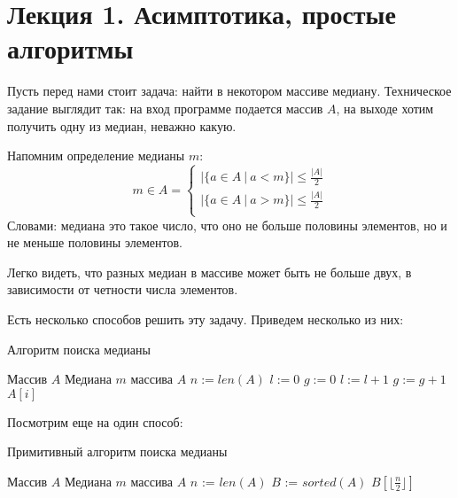 \documentclass[../book.tex]{subfiles}
\begin{document}
	\section{Лекция 1. Асимптотика, простые алгоритмы}
	
	Пусть перед нами стоит задача: найти в некотором массиве медиану. Техническое задание выглядит так: на вход программе подается массив $A$, на выходе хотим получить одну из медиан, неважно какую.
	
	Напомним определение медианы $m$:
	\[
	m \in A = 
	\begin{cases}
		|\{ a \in A \ | \ a < m \}| \leqslant \frac{|A|}{2} \\
		|\{ a \in A \ | \ a > m \}| \leqslant \frac{|A|}{2} \\
	\end{cases}
	\]
	Словами: медиана это такое число, что оно не больше половины элементов, но и не меньше половины элементов.
	
	Легко видеть, что разных медиан в массиве может быть не больше двух, в зависимости от четности числа элементов.
	
	Есть несколько способов решить эту задачу. Приведем несколько из них:
	
	\begin{algorithm}
		\caption{Алгоритм поиска медианы}
		\begin{algorithmic}[1]
			\Require Массив $A$
			\Ensure Медиана $m$ массива $A$
				\State $n := len(A)$
					\State $l := 0$
					\State $g := 0$
							\State $l := l + 1$
							\State $g := g + 1$
						\EndIf
					\EndFor
					\State \Return $A[i]$
				\EndIf
				\EndFor
			\EndFunction
		\end{algorithmic}
	\end{algorithm}
	
	

	
	Посмотрим еще на один способ:
	
	\begin{algorithm}
		\caption{Примитивный алгоритм поиска медианы}
		\begin{algorithmic}[1]
			\Require Массив $A$
			\Ensure Медиана $m$ массива $A$
			\Function{Median}{$A$}
				\State $n$ := $len(A)$
				\State $B$ := $sorted(A)$
				\State \Return $B[\lfloor\frac{n}{2}\rfloor]$
			\EndFunction
		\end{algorithmic}
	\end{algorithm}
	
\end{document}
